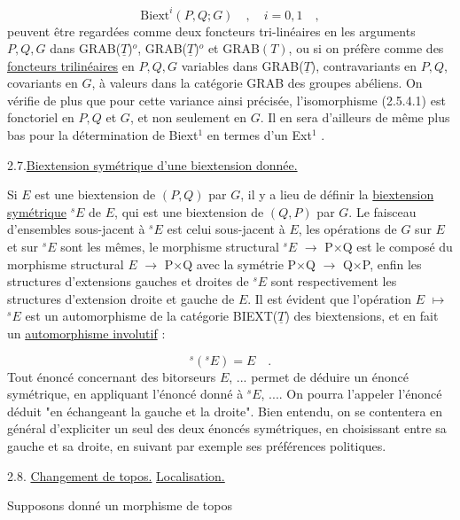 \begin{equation}\tag{2.6.2}
\mathrm{Biext}^{i}(P,Q;G) \quad , \quad i=0,1 \quad ,
\end{equation}
peuvent être regardées comme deux foncteurs tri-linéaires en les arguments $P,Q,G$ dans GRAB($\underline{T}$)$^{o}$, GRAB($\underline{T}$)$^{o}$ et GRAB$(T)$, ou si on préfère comme des \underline{foncteurs trilinéaires} en $P,Q,G$ variables dans GRAB($\underline{T}$), contravariants en $P,Q$, covariants en $G$, à valeurs dans la catégorie GRAB des groupes abéliens. On vérifie de plus que pour cette variance ainsi précisée, l'isomorphisme (2.5.4.1) est fonctoriel en $P,Q$ et $G$, et non seulement en $G$. Il en sera d'ailleurs de même plus bas pour la détermination de Biext$^{1}$ en termes d'un Ext$^{1}$ .


2.7.\underline{Biextension symétrique d'une biextension donnée.}

Si $E$ est une biextension de $(P,Q)$ par $G$, il y a lieu de définir la \underline{biextension symétrique} $^{s}E$ de $E$, qui est une biextension de $(Q,P)$ par $G$. Le faisceau d'ensembles sous-jacent à $^{s}E$ est celui sous-jacent à $E$, les opérations de $G$ sur $E$ et sur $^{s}E$ sont les mêmes, le morphisme structural $^{s}E$ $\longrightarrow$ P$\times$Q est le composé du morphisme structural $E$ $\longrightarrow$ P$\times$Q avec la symétrie P$\times$Q $\longrightarrow$ Q$\times$P, enfin les structures
d'extensions gauches et droites de $^{s}E$ sont respectivement les structures d'extension droite et gauche de $E$. Il est évident que l'opération $E$ $\longmapsto$ $^{s}E$ est un automorphisme de la catégorie BIEXT($\underline{T}$) des biextensions, et en fait un \underline{automorphisme involutif} :

\begin{equation*}
{}^{s}({}^{s}E) = E \quad .
\end{equation*}
Tout énoncé concernant des bitorseurs $E$, ... permet de déduire un énoncé symétrique, en appliquant l'énoncé donné à $^{s}E$, .... On pourra l'appeler l'énoncé déduit "en échangeant la gauche et la droite". Bien entendu, on se contentera en général d'expliciter un seul des deux énoncés symétriques, en choisissant entre sa gauche et sa droite, en suivant par exemple ses préférences politiques.


2.8.  \underline{Changement de topos.} \underline{Localisation.}

Supposons donné un morphisme de topos

